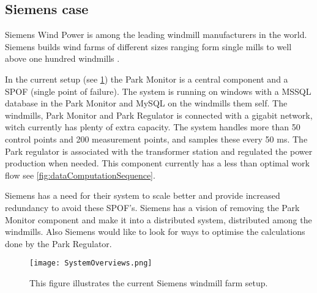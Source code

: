 \subsection{Siemens case}
Siemens Wind Power is among the leading windmill manufacturers in the world. 
Siemens builds wind farms of different sizes ranging form single mills to well above one hundred windmills \cite{simensOffShoreProjects, simensOnShoreProjects}.

In the current setup (see \cref{fig:currentSiemensSetup}) the Park Monitor is a central component and a SPOF (single point of failure).
The system is running on windows with a MSSQL database in the Park Monitor and MySQL on the windmills them self.
The windmills, Park Monitor and Park Regulator is connected with a gigabit network, witch currently has plenty of extra capacity.
The system handles more than 50 control points and 200 measurement points, and samples these every 50 ms.
The Park regulator is associated with the transformer station and regulated the power production when needed.
This component currently has a less than optimal work flow see \cref{fig:dataComputationSequence}.

Siemens has a need for their system to scale better and provide increased redundancy to avoid these SPOF's.
Siemens has a vision of removing the Park Monitor component and make it into a distributed system, distributed among the windmills. %
Also Siemens would like to look for ways to optimise the calculations done by the Park Regulator.

\begin{figure}
	\centering
	\texttt{[image: SystemOverviews.png]} 
	\caption[Illustrates the current Siemens windmill farm setup]{
		\label{fig:currentSiemensSetup} 
		\footnotesize{%
			This figure illustrates the current Siemens windmill farm setup.
		}
	}
\end{figure}



